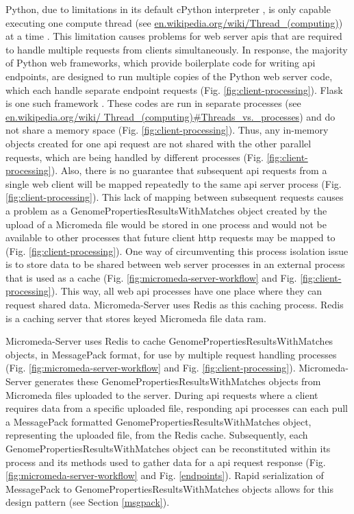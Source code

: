 Python, due to limitations in its default cPython interpreter 
\cite{van1995python}, is only capable executing one compute thread 
\cite{saltzer1966traffic} (see 
\href{http://en.wikipedia.org/wiki/Thread_(computing)}{en.wikipedia.org/wiki/Thread\_(computing)}) 
at a time \cite{beazley2010understanding}. This limitation causes problems for 
web server \gls{api}s that are required to handle multiple requests from clients 
simultaneously. In response, the majority of Python web frameworks, which 
provide boilerplate code for writing \gls{api} endpoints, are designed to run 
multiple copies of the Python web server code, which each handle separate 
endpoint requests (Fig. \ref{fig:client-processing}). Flask is one such 
framework \cite{grinberg2018flask}. These codes are run in separate processes 
(see 
\href{http://en.wikipedia.org/wiki/Thread_(computing)\#Threads\_vs.\_processes}{en.wikipedia.org/wiki/ 
Thread\_(computing)\#Threads\_vs.\_processes}) and do not share a memory space 
(Fig. \ref{fig:client-processing}). Thus, any in-memory objects created for one 
\gls{api} request are not shared with the other parallel requests, which are 
being handled by different processes (Fig. \ref{fig:client-processing}). Also, 
there is no guarantee that subsequent \gls{api} requests from a single web 
client will be mapped repeatedly to the same \gls{api} server process (Fig. 
\ref{fig:client-processing}). This lack of mapping between subsequent requests 
causes a problem as a GenomePropertiesResultsWithMatches object created by the 
upload of a Micromeda file would be stored in one process and would not be 
available to other processes that future client \gls{http} requests may be 
mapped to (Fig. \ref{fig:client-processing}). One way of circumventing this 
process isolation issue is to store data to be shared between web server 
processes in an external process that is used as a cache (Fig. 
\ref{fig:micromeda-server-workflow} and Fig. \ref{fig:client-processing}). This 
way, all web \gls{api} processes have one place where they can request shared 
data. Micromeda-Server uses Redis as this caching process. Redis is a caching 
server that stores keyed Micromeda file data \gls{ram}. 

Micromeda-Server uses Redis to cache GenomePropertiesResultsWithMatches objects, 
in MessagePack format, for use by multiple request handling processes (Fig. 
\ref{fig:micromeda-server-workflow} and Fig. \ref{fig:client-processing}). 
Micromeda-Server generates these GenomePropertiesResultsWithMatches objects from 
Micromeda files uploaded to the server. During \gls{api} requests where a client 
requires data from a specific uploaded file, responding \gls{api} processes can 
each pull a MessagePack formatted GenomePropertiesResultsWithMatches object, 
representing the uploaded file, from the Redis cache. Subsequently, each 
GenomePropertiesResultsWithMatches object can be reconstituted within its 
process and its methods used to gather data for a \gls{api} request response 
(Fig. \ref{fig:micromeda-server-workflow} and Fig. \ref{endpoints}). Rapid 
serialization of MessagePack to GenomePropertiesResultsWithMatches objects 
allows for this design pattern (see Section \ref{msgpack}).

